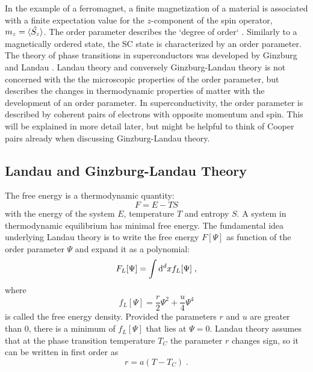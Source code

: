 \documentclass[../notes.tex]{subfiles}
\begin{document}
In the example of a ferromagnet, a finite magnetization of a material is associated with a finite expectation value for the \(z\)-component of the spin operator, \(m_z = \braket{\hat{S_z}}\).
The order parameter describes the `degree of order` \cite{landauTheoryPhaseTransitions1937}.
Similarly to a magnetically ordered state, the SC state is characterized by an order parameter.
The theory of phase transitions in superconductors was developed by Ginzburg and Landau \cite{ginzburgTheorySuperconductivity1950}.
Landau theory and conversely Ginzburg-Landau theory is not concerned with the the microscopic properties of the order parameter, but describes the changes in thermodynamic properties of matter with the development of an order parameter.
In superconductivity, the order parameter is described by coherent pairs of electrons with opposite momentum and spin.
This will be explained in more detail later, but might be helpful to think of Cooper pairs already when discussing Ginzburg-Landau theory.  

\subsection*{Landau and Ginzburg-Landau Theory}\label{sub:Landau and Ginzburg-Landau Theory}

The free energy is a thermodynamic quantity:
\begin{equation}
	F = E - T S
\end{equation}
with the energy of the system \(E\), temperature \(T\) and entropy \(S\).
A system in thermodynamic equilibrium has minimal free energy.
The fundamental idea underlying Landau theory is to write the free energy \(F[\Psi]\) as function of the order parameter \(\Psi\) and expand it as a polynomial:
\begin{equation}
	F_L[\Psi] = \int \odif[order={d}]{x} f_L [\Psi] \;,
\end{equation}
where
\begin{equation}
	f_L [\Psi] = \frac{r}{2} \Psi^2 + \frac{u}{4} \Psi^4
\end{equation}
is called the free energy density.
Provided the parameters \(r\) and \(u\) are greater than \(0\), there is a minimum of \(f_L [\Psi]\) that lies at \(\Psi = 0\).
Landau theory assumes that at the phase transition temperature \(T_C\) the parameter \(r\) changes sign, so it can be written in first order as
\begin{equation}
	r = a(T - T_C) \;.
\end{equation}
\end{document}
